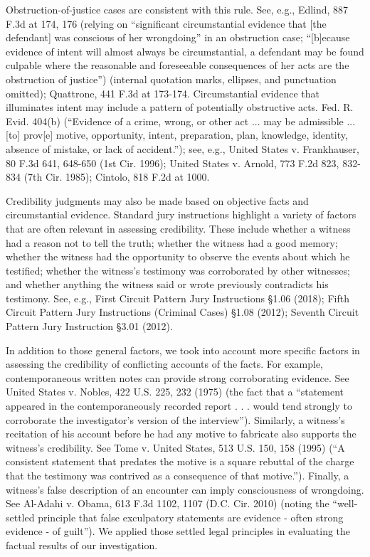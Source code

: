 Obstruction-of-justice cases are consistent with this rule.
See, e.g., Edlind, 887 F.3d at 174, 176 (relying on “significant circumstantial evidence that [the defendant] was conscious of her wrongdoing” in an obstruction case; “[b]ecause evidence of intent will almost always be circumstantial, a defendant may be found culpable where the reasonable and foreseeable consequences of her acts are the obstruction of justice”) (internal quotation marks, ellipses, and punctuation omitted);
Quattrone, 441 F.3d at 173-174.
Circumstantial evidence that illuminates intent may include a pattern of potentially obstructive acts. Fed. R. Evid. 404(b) (“Evidence of a crime, wrong, or other act ... may be admissible ... [to] prov[e] motive, opportunity, intent, preparation, plan, knowledge, identity, absence of mistake, or lack of accident.”);
see, e.g., United States v. Frankhauser, 80 F.3d 641, 648-650 (1st Cir. 1996);
United States v. Arnold, 773 F.2d 823, 832-834 (7th Cir. 1985);
Cintolo, 818 F.2d at 1000.

Credibility judgments may also be made based on objective facts and circumstantial evidence.
Standard jury instructions highlight a variety of factors that are often relevant in assessing credibility.
These include whether a witness had a reason not to tell the truth; whether the witness had a good memory;
whether the witness had the opportunity to observe the events about which he testified;
whether the witness’s testimony was corroborated by other witnesses;
and whether anything the witness said or wrote previously contradicts his testimony.
See, e.g., First Circuit Pattern Jury Instructions \S 1.06 (2018);
Fifth Circuit Pattern Jury Instructions (Criminal Cases) \S 1.08 (2012);
Seventh Circuit Pattern Jury Instruction \S 3.01 (2012).

In addition to those general factors, we took into account more specific factors in assessing the credibility of conflicting accounts of the facts.
For example, contemporaneous written notes can provide strong corroborating evidence. See United States v. Nobles, 422 U.S. 225, 232 (1975) (the fact that a “statement appeared in the contemporaneously recorded report . . . would tend strongly to corroborate the investigator’s version of the interview”).
Similarly, a witness’s recitation of his account before he had any motive to fabricate also supports the witness’s credibility.
See Tome v. United States, 513 U.S. 150, 158 (1995) (“A consistent statement that predates the motive is a square rebuttal of the charge that the testimony was contrived as a consequence of that motive.”).
Finally, a witness’s false description of an encounter can imply consciousness of wrongdoing.
See Al-Adahi v. Obama, 613 F.3d 1102, 1107 (D.C. Cir. 2010) (noting the “well-settled principle that false exculpatory statements are evidence - often strong evidence - of guilt”).
We applied those settled legal principles in evaluating the factual results of our investigation.
